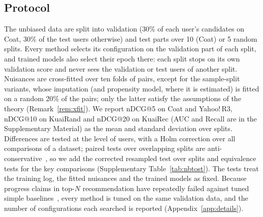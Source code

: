 \subsection{Protocol}\label{sec:protocol}

The unbiased data are split into validation (30\% of each user's candidates on
Coat, 30\% of the test users otherwise) and test parts over 10 (Coat) or 5 random
splits. Every method selects its configuration on the validation part of each
split, and trained models also select their epoch there: each split stops on its
own validation score and never sees the validation or test users of another split.
Nuisances are cross-fitted over ten folds of pairs, except for the sample-split
variants, whose imputation (and propensity model, where it is estimated) is fitted
on a random 20\% of the pairs; only the latter satisfy the assumptions of the
theory (Remark~\ref{rem:xfit}). We report nDCG@5 on Coat and Yahoo!\,R3, nDCG@10
on KuaiRand and nDCG@20 on KuaiRec (AUC and Recall are in the Supplementary
Material) as the mean and standard deviation over splits. Differences are tested
at the level of users, with a Holm correction over all comparisons of a dataset;
paired tests over overlapping splits are anti-conservative~\citep{nadeau2003}, so
we add the corrected resampled test over splits and equivalence tests for the
key comparisons (Supplementary Table~\ref{tab:nbtost}). The tests treat the training log,
the fitted nuisances and the trained models as fixed. Because progress claims in
top-$N$ recommendation have repeatedly failed against tuned simple
baselines~\citep{dacrema2019progress,rendle2019baselines,anelli2023myth}, every
method is tuned on the same validation data, and the number of configurations
each searched is reported (Appendix~\ref{app:details}).
